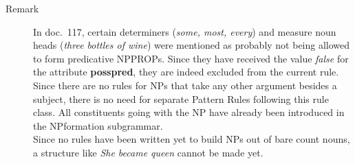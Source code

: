 \begin{description}
\item[Remark] In doc.\ 117, certain determiners ({\em some, most, every\/}) and 
measure noun heads ({\em three bottles of wine\/}) were mentioned as probably 
not being allowed to form predicative NPPROPs. Since they have received the 
value {\em false\/} for the attribute {\bf posspred}, they are indeed excluded 
from the current rule.\\
Since there are no rules for NPs that take any other argument besides a 
subject, there 
is no need for separate Pattern Rules following this rule class. All 
constituents
going with the NP have already been introduced in the NPformation subgrammar.\\
Since no rules have been written yet to build NPs out of bare count nouns, a 
structure like {\em She became queen\/} cannot be made yet.


\end{description}

\newpage
